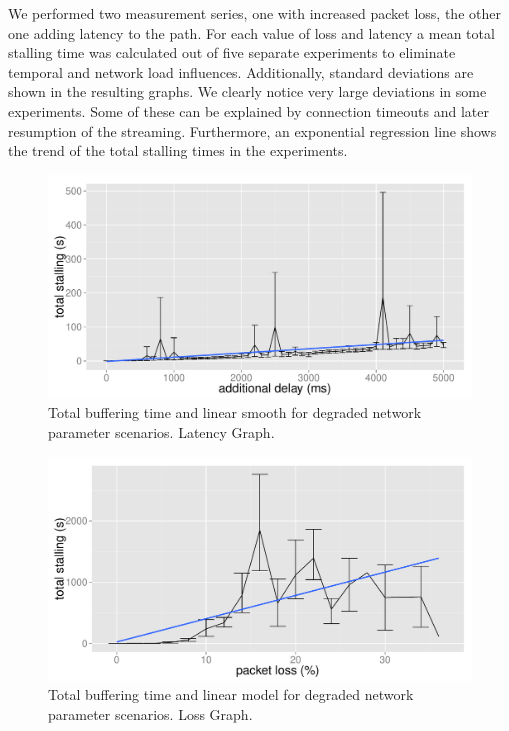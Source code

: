 We performed two measurement series, one with increased packet loss, the other one adding latency to the path. For each value of loss and latency a mean total stalling time was calculated out of five separate experiments to eliminate temporal and network load influences. Additionally, standard deviations are shown in the resulting graphs. We clearly notice very large deviations in some experiments. Some of these can be explained by connection timeouts and later resumption of the streaming. Furthermore, an exponential regression line shows the trend of the total stalling times in the experiments.

\begin{figure}[htbp]
    \centering
    \includegraphics[width=\textwidth]{images/R-delayseries.pdf}
    \caption{Total buffering time and linear smooth for degraded network parameter scenarios. Latency Graph.}
    \label{c3:fig:delayseries}
\end{figure}

\begin{figure}[htbp]
    \centering
    \includegraphics[width=\textwidth]{images/R-lossseries.pdf}
    \caption{Total buffering time and linear model for degraded network parameter scenarios. Loss Graph.}
    \label{c3:fig:lossseries}
\end{figure}

